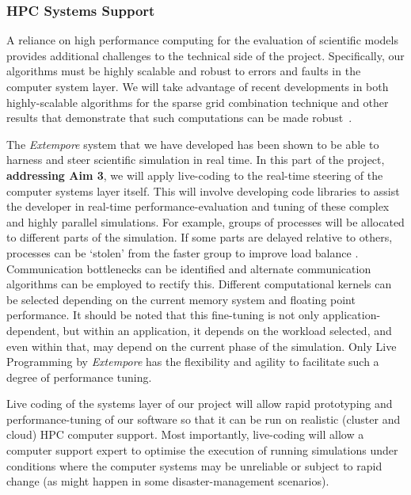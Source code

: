 \subsubsection*{HPC Systems Support}

A reliance on high performance computing for the evaluation of
scientific models provides additional challenges to the technical side
of the project. Specifically, our algorithms must be highly scalable
and robust to errors and faults in the computer system layer. 
We will take advantage of 
recent developments in both highly-scalable algorithms
for the sparse grid combination
technique \cite{sgctalg15,pdsec15extsgctalg} and other results that demonstrate that such
computations can be made
robust~\parencite{HardingHLS2015,AliEtal2015,Ali11022016}. 


\iffalse
In this project we will leverage on-demand compute resources, such as
the Amazon AWS cloud~\parencite{amazonAws} and the National Compute
Infrastructure NCI Cloud~\parencite{nciCloud}. Using these cloud
services will further improve the project's ability to deliver timely
results in high-pressure and time-critical decision making scenarios.

Once again, we emphasise that our approach to live coding of test
software is a novel aspect of our methodology. 
\fi

The \emph{Extempore}
system that we have developed has been shown to be able to harness and
steer scientific simulation in real time. In this part of the project, {\bf addressing Aim 3},
we will apply live-coding to the real-time steering of the computer
systems layer itself. This will involve developing code libraries to assist the developer in
real-time performance-evaluation and tuning of these complex and highly
parallel simulations. For example, groups of processes will be
allocated to different parts of the simulation. If some parts are
delayed relative to others, processes can be `stolen' from the faster
group to improve load balance \cite{parSGCT16}. Communication
bottlenecks can be identified and alternate communication algorithms
can be employed to rectify this.  Different computational kernels can
be selected depending on the current memory system and floating point
performance.  It should be noted that this fine-tuning is not only
application-dependent, but within an application, it depends on the
workload selected, and even within that, may depend on the current
phase of the simulation. Only Live Programming by \emph{Extempore} has
the flexibility and agility to facilitate such a degree of performance
tuning.

Live coding of the systems layer of our project will
allow rapid prototyping and performance-tuning of our software so that
it can be run on realistic (cluster and cloud) HPC computer
support. Most importantly, live-coding will allow a computer support
expert to optimise the execution of running simulations under
conditions where the computer systems may be unreliable or subject to
rapid change (as might happen in some disaster-management scenarios).
